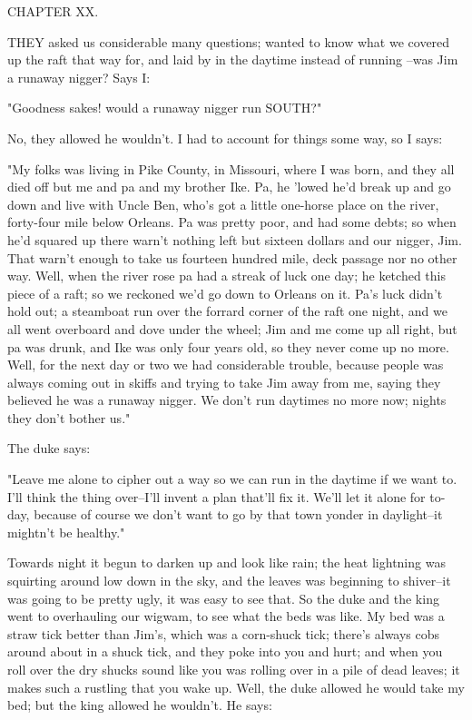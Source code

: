 CHAPTER XX.

THEY asked us considerable many questions; wanted to know what we covered
up the raft that way for, and laid by in the daytime instead of running
--was Jim a runaway nigger?  Says I:

"Goodness sakes! would a runaway nigger run SOUTH?"

No, they allowed he wouldn't.  I had to account for things some way, so I
says:

"My folks was living in Pike County, in Missouri, where I was born, and
they all died off but me and pa and my brother Ike.  Pa, he 'lowed he'd
break up and go down and live with Uncle Ben, who's got a little
one-horse place on the river, forty-four mile below Orleans.  Pa was
pretty poor, and had some debts; so when he'd squared up there warn't
nothing left but sixteen dollars and our nigger, Jim.  That warn't enough
to take us fourteen hundred mile, deck passage nor no other way.  Well,
when the river rose pa had a streak of luck one day; he ketched this
piece of a raft; so we reckoned we'd go down to Orleans on it.  Pa's luck
didn't hold out; a steamboat run over the forrard corner of the raft one
night, and we all went overboard and dove under the wheel; Jim and me
come up all right, but pa was drunk, and Ike was only four years old, so
they never come up no more.  Well, for the next day or two we had
considerable trouble, because people was always coming out in skiffs and
trying to take Jim away from me, saying they believed he was a runaway
nigger.  We don't run daytimes no more now; nights they don't bother us."

The duke says:

"Leave me alone to cipher out a way so we can run in the daytime if we
want to.  I'll think the thing over--I'll invent a plan that'll fix it.
We'll let it alone for to-day, because of course we don't want to go by
that town yonder in daylight--it mightn't be healthy."

Towards night it begun to darken up and look like rain; the heat
lightning was squirting around low down in the sky, and the leaves was
beginning to shiver--it was going to be pretty ugly, it was easy to see
that.  So the duke and the king went to overhauling our wigwam, to see
what the beds was like.  My bed was a straw tick better than Jim's, which
was a corn-shuck tick; there's always cobs around about in a shuck tick,
and they poke into you and hurt; and when you roll over the dry shucks
sound like you was rolling over in a pile of dead leaves; it makes such a
rustling that you wake up.  Well, the duke allowed he would take my bed;
but the king allowed he wouldn't.  He says:


